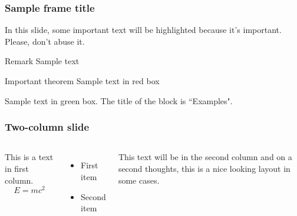 \documentclass{beamer}
\begin{document}
\begin{frame}
\frametitle{\textbf{Sample frame title}}

In this slide, some important text will be
\alert{highlighted} because it's important.
Please, don't abuse it.

\begin{block}{Remark}
Sample text
\end{block}

\begin{alertblock}{Important theorem}
Sample text in red box
\end{alertblock}

\begin{examples}
Sample text in green box. The title of the block is ``Examples".
\end{examples}
\end{frame}
\begin{frame}
\frametitle{\textbf{Two-column slide}}
\begin{columns}
This is a text in first column.
$$E=mc^2$$
\begin{itemize}
\item First item
\item Second item
\end{itemize}

This text will be in the second column
and on a second thoughts, this is a nice looking
layout in some cases.
\end{columns}
\end{frame}
\end{document}
